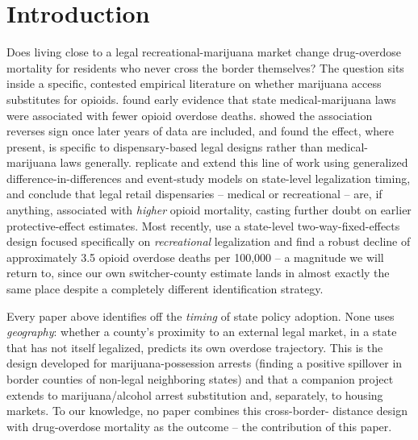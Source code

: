 \documentclass[11pt]{article}
\begin{document}
\begin{titlepage}
\vspace{0.5cm}
\end{titlepage}

\section{Introduction}

Does living close to a legal recreational-marijuana market change
drug-overdose mortality for residents who never cross the border
themselves? The question sits inside a specific, contested empirical
literature on whether marijuana access substitutes for opioids.
\citet{Bachhuber2014} found early evidence that state medical-marijuana
laws were associated with fewer opioid overdose deaths.
\citet{Shover2019} showed the association reverses sign once later
years of data are included, and \citet{PowellPaculaJacobson2018} found
the effect, where present, is specific to dispensary-based legal
designs rather than medical-marijuana laws generally.
\citet{MathurRuhm2022} replicate and extend this line of work using
generalized difference-in-differences and event-study models on
state-level legalization timing, and conclude that legal retail
dispensaries -- medical or recreational -- are, if anything, associated
with \emph{higher} opioid mortality, casting further doubt on earlier
protective-effect estimates. Most recently, \citet{Denkyirah2026} use a
state-level two-way-fixed-effects design focused specifically on
\emph{recreational} legalization and find a robust decline of
approximately 3.5 opioid overdose deaths per 100,000 -- a magnitude we
will return to, since our own switcher-county estimate lands in almost
exactly the same place despite a completely different identification
strategy.

Every paper above identifies off the \emph{timing} of state policy
adoption. None uses \emph{geography}: whether a county's proximity to
an external legal market, in a state that has not itself legalized,
predicts its own overdose trajectory. This is the design
\citet{HaoCowan2020} developed for marijuana-possession arrests
(finding a positive spillover in border counties of non-legal
neighboring states) and that a companion project extends to
marijuana/alcohol arrest substitution and, separately, to housing
markets. To our knowledge, no paper combines this cross-border-
distance design with drug-overdose mortality as the outcome -- the
contribution of this paper.
\end{document}
